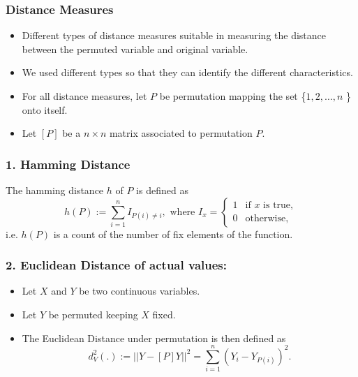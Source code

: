 \documentclass{beamer}
\begin{document}
\begin{frame}
\frametitle{Distance Measures}
\begin{itemize}
\item Different types of distance measures suitable in measuring the distance between the permuted variable and original variable.
\item We used different types so that they can identify the different characteristics.
\item For all distance measures, let $P$ be permutation mapping the set \{$1, 2, \dots,n$ \} onto itself. 
\item Let $[P]$ be a $n \times n$ matrix associated to permutation $P$.
\end{itemize}
\end{frame}

\begin{frame}
\frametitle{1. Hamming Distance}

 The hamming distance $h$ of $P$ is defined as 
\[
h(P) := \sum_{i=1}^n I_{P(i) \neq i},  \text{ where } I_{x} = \left \{ 
\begin{array}{ll}
1 & \text{if } x \text{ is true},\\
0 & \text{otherwise},
\end{array} \right.
\]
i.e. $h(P)$ is a count of the number of fix elements of the function.


\end{frame}


\begin{frame}
\frametitle{2. Euclidean Distance of actual values:}
\begin{itemize}
\item Let $X$ and $Y$ be two continuous variables.
\item Let $Y$ be permuted keeping $X$ fixed. 
\item The Euclidean Distance under permutation is then defined as 
\[
d^2_V(.) := || Y - [P]Y||^2 = \sum_{i=1}^n (Y_i - Y_{P(i)})^2.
\]
\end{itemize}
\end{frame}
\end{document}
